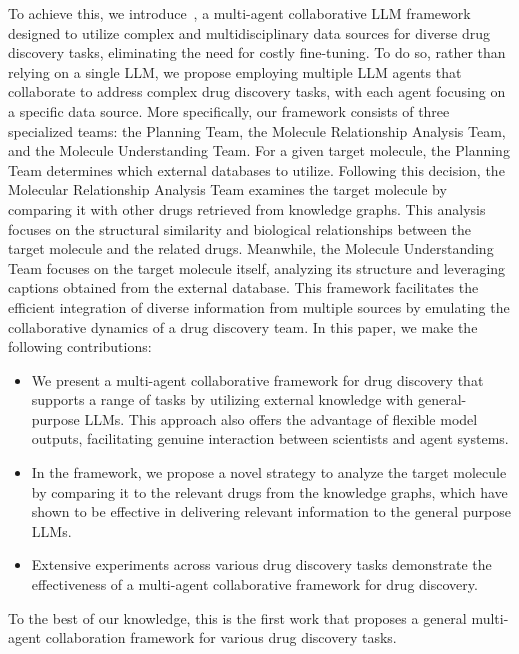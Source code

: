 To achieve this, we introduce~\proposed, a multi-agent collaborative LLM framework designed to utilize complex and multidisciplinary data sources for diverse drug discovery tasks, eliminating the need for costly fine-tuning.
To do so, rather than relying on a single LLM, we propose employing multiple LLM agents that collaborate to address complex drug discovery tasks, with each agent focusing on a specific data source.
More specifically, our framework consists of three specialized teams: the Planning Team, the Molecule Relationship Analysis Team, and the Molecule Understanding Team. 
For a given target molecule, the Planning Team determines which external databases to utilize. 
Following this decision, the Molecular Relationship Analysis Team examines the target molecule by comparing it with other drugs retrieved from knowledge graphs. 
This analysis focuses on the structural similarity and biological relationships between the target molecule and the related drugs. 
Meanwhile, the Molecule Understanding Team focuses on the target molecule itself, analyzing its structure and leveraging captions obtained from the external database.
This framework facilitates the efficient integration of diverse information from multiple sources by emulating the collaborative dynamics of a drug discovery team.
In this paper, we make the following contributions:
\begin{itemize}
    \item We present a multi-agent collaborative framework for drug discovery that supports a range of tasks by utilizing external knowledge with general-purpose LLMs. This approach also offers the advantage of flexible model outputs, facilitating genuine interaction between scientists and agent systems.
    \item In the framework, we propose a novel strategy to analyze the target molecule by comparing it to the relevant drugs from the knowledge graphs, which have shown to be effective in delivering relevant information to the general purpose LLMs.
    \item Extensive experiments across various drug discovery tasks demonstrate the effectiveness of a multi-agent collaborative framework for drug discovery.
\end{itemize}
To the best of our knowledge, this is the first work that proposes a general multi-agent collaboration framework for various drug discovery tasks.
